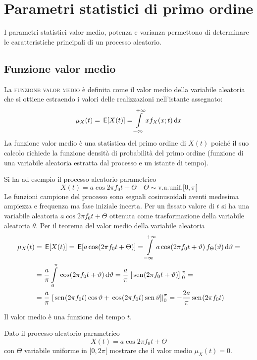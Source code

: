 \section{Parametri statistici di primo ordine}
I parametri statistici valor medio, potenza e varianza permettono di determinare le caratteristiche principali di un processo aleatorio.

\subsection{Funzione valor medio}
La \textsc{funzione valor medio} è definita come il valor medio della variabile aleatoria che si ottiene estraendo i valori delle realizzazioni nell'istante assegnato:
\begin{equation}\label{eq:proc_valor_medio}
\mu_X(t)=\,{\operatorname{\mathsf{E}}}\!\left[{X(t)}\right]=\int\limits_{-\infty}^{+\infty}{x f_X(x;t)}{\,\mathop{}\!\mathrm{d}{x}}
\end{equation}
La funzione valor medio è una statistica del primo ordine di $X(t)$ poiché il suo calcolo richiede la funzione densità di probabilità del primo ordine (funzione di una variabile aleatoria estratta dal processo e un istante di tempo).

\begin{esempio}
Si ha ad esempio il processo aleatorio parametrico
\[X(t)=a\cos{2\pi f_0 t+\Theta}\quad\Theta\sim\text{v.a.unif.} [0,\pi[\]
Le funzioni campione del processo sono segnali cosinusoidali aventi medesima ampiezza e frequenza ma fase iniziale incerta. Per un fissato valore di $t$ si ha una variabile aleatoria $a\cos{2\pi f_0 t+\Theta}$ ottenuta come trasformazione della variabile aleatoria $\theta$. 
Per il teorema del valor medio della variabile aleatoria
\begin{equation}\label{eq:esempio_processo_non_stazionario_valor_medio}
\begin{split}\mu_X(t)&=\E{X(t)}=\E{a\cos{2\pi f_0 t+\Theta}}=\intinf{ a\cos{2\pi f_0 t+\theta}f_\Theta(\theta)}{\theta}=\\
&=\frac{a}{\pi}\intd{0}{\pi}{\cos{2\pi f_0 t+\theta}}{\theta}=\frac{a}{\pi}\bound{0}{\pi}{\sen{2\pi f_0 t+\theta}}=\\
&=\frac{a}{\pi}\bound{0}{\pi}{\sen{2\pi f_0 t}\Cos\theta+\cos{2\pi f_0 t}\Sen\theta}=-\frac{2a}{\pi}\sen{2\pi f_0 t}\end{split}\end{equation}

Il valor medio è una funzione del tempo $t$.
\end{esempio}

\begin{esercizio}Dato il processo aleatorio parametrico
\[X(t)=a\cos{2\pi f_0 t+\Theta}\]
con $\Theta$ variabile uniforme in $[0,2\pi[$ mostrare che il valor medio $\mu_X(t)=0$.
\end{esercizio}

